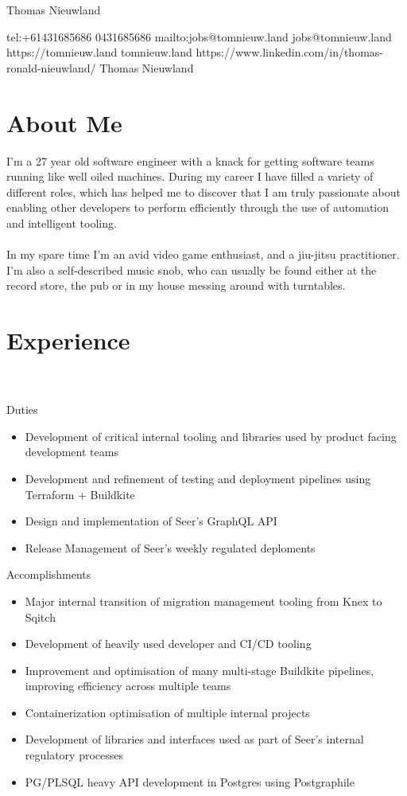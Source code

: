 \documentclass{resume}
\begin{document}
\ContactName
{Thomas Nieuwland}

\ContactInfoDigital
  {tel:+61431685686}
  {0431685686}
  {mailto:jobs@tomnieuw.land}
  {jobs@tomnieuw.land}
  {https://tomnieuw.land}
  {tomnieuw.land}
  {https://www.linkedin.com/in/thomas-ronald-nieuwland/}
  {Thomas Nieuwland}

\section{{\faUser} About Me}
I'm a 27 year old software engineer with a knack for getting software teams running like well oiled machines. During my 
career I have filled a variety of different roles, which has helped me to discover that I am truly passionate about 
enabling other developers to perform efficiently through the use of automation and intelligent tooling.
\\~\\
In my spare time I'm an avid video game enthusiast, and a jiu-jitsu practitioner. I'm also a self-described music
snob, who can usually be found either at the record store, the pub or in my house messing around with turntables.

\section{{\faBriefcase} Experience}
 \\
 \\
Duties \\
\begin{itemize}
  \item Development of critical internal tooling and libraries used by product facing development teams
  \item Development and refinement of testing and deployment pipelines using Terraform + Buildkite
  \item Design and implementation of Seer's GraphQL API
  \item Release Management of Seer's weekly regulated deploments
\end{itemize}
Accomplishments \\
\begin{itemize}
  \item Major internal transition of migration management tooling from Knex to Sqitch
  \item Development of heavily used developer and CI/CD tooling
  \item Improvement and optimisation of many multi-stage Buildkite pipelines, improving efficiency across multiple teams
  \item Containerization optimisation of multiple internal projects
  \item Development of libraries and interfaces used as part of Seer's internal regulatory processes
  \item PG/PLSQL heavy API development in Postgres using Postgraphile
\end{itemize}
\end{document}
